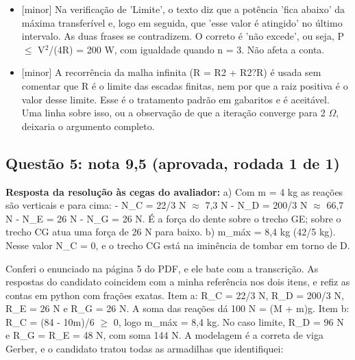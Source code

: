 \documentclass{article}%
\begin{document}
\begin{itemize}%
\item%
{[}minor{]} Na verificação de 'Limite', o texto diz que a potência 'fica abaixo' da máxima transferível e, logo em seguida, que 'esse valor é atingido' no último intervalo. As duas frases se contradizem. O correto é 'não excede', ou seja, P $\leq$ V$^2$/(4R) = 200 W, com igualdade quando n = 3. Não afeta a conta.%
\item%
{[}minor{]} A recorrência da malha infinita (R = R2 + R2?R) é usada sem comentar que R é o limite das escadas finitas, nem por que a raiz positiva é o valor desse limite. Esse é o tratamento padrão em gabaritos e é aceitável. Uma linha sobre isso, ou a observação de que a iteração converge para 2 $\Omega$, deixaria o argumento completo.%
\end{itemize}%
\subsection*{Questão 5: nota 9,5 (aprovada, rodada 1 de 1)}%
\textbf{Resposta da resolução às cegas do avaliador:} a) Com m = 4 kg as reações são verticais e para cima:\newline%
{-} N\_C = 22/3 N $\approx$ 7,3 N\newline%
{-} N\_D = 200/3 N $\approx$ 66,7 N\newline%
{-} N\_E = 26 N\newline%
{-} N\_G = 26 N. É a força do dente sobre o trecho GE; sobre o trecho CG atua uma força de 26 N para baixo.\newline%
\newline%
b) m\_máx = 8,4 kg (42/5 kg). Nesse valor N\_C = 0, e o trecho CG está na iminência de tombar em torno de D.\par %
Conferi o enunciado na página 5 do PDF, e ele bate com a transcrição. As respostas do candidato coincidem com a minha referência nos dois itens, e refiz as contas em python com frações exatas.\newline%
\newline%
Item a: R\_C = 22/3 N, R\_D = 200/3 N, R\_E = 26 N e R\_G = 26 N. A soma das reações dá 100 N = (M + m)g.\newline%
\newline%
Item b: R\_C = (84 - 10m)/6 $\geq$ 0, logo m\_máx = 8,4 kg. No caso limite, R\_D = 96 N e R\_G = R\_E = 48 N, com soma 144 N.\newline%
\newline%
A modelagem é a correta de viga Gerber, e o candidato tratou todas as armadilhas que identifiquei:\newline%
\end{document}
